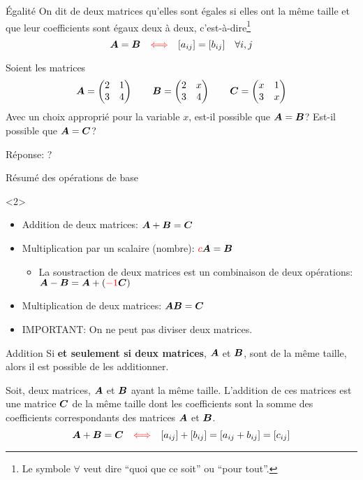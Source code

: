 \documentclass[french, handout]{beamer}
\begin{document}
\begin{frame}{Égalité}
On dit de deux matrices qu'elles sont égales si elles ont la même taille
et que leur coefficients sont égaux deux à deux, c'est-à-dire\footnote{Le symbole $\forall$ veut dire 
``quoi que ce soit'' ou ``pour tout''.}
\[
\boldsymbol{A} = \boldsymbol{B} \quad {\color{red}\Longleftrightarrow} \quad [a_{ij}] = [b_{ij}]  \quad \forall i, j
\]

\begin{example}
Soient les matrices
    \[
    \boldsymbol{A} = \begin{pmatrix}
        2 & 1 \\
        3 & 4
        \end{pmatrix}
    \qquad
    \boldsymbol{B} = \begin{pmatrix}
        2 & x \\
        3 & 4
        \end{pmatrix}
        \qquad
    \boldsymbol{C} = \begin{pmatrix}
        x & 1 \\
        3 & x
        \end{pmatrix}
    \]
Avec un choix approprié pour la variable $x$, est-il possible que $\boldsymbol{A} =\boldsymbol{B}$?
Est-il possible que $\boldsymbol{A} = \boldsymbol{C}$?
\end{example}
Réponse: ?
\end{frame}		
		
	\begin{frame}{Résumé des opérations de base}
	\begin{block}{}<2>
\begin{itemize}
	\item Addition de deux matrices: $\boldsymbol{A} + \boldsymbol{B} = \boldsymbol{C}$
	\item Multiplication par un scalaire (nombre): ${\color{red}c}\boldsymbol{A} = \boldsymbol{B}$
	\begin{itemize}
		\item La soustraction de deux matrices est un combinaison de
		deux opérations:  $\boldsymbol{A} - \boldsymbol{B} = \boldsymbol{A} + ({\color{red}-1}\boldsymbol{C})$
	\end{itemize}
	\item Multiplication de deux matrices: $\boldsymbol{A}\boldsymbol{B} = \boldsymbol{C}$
	\item IMPORTANT: On ne peut pas diviser deux matrices.
\end{itemize}
	\end{block}
\end{frame}

\begin{frame}{Addition}
Si \textbf{et seulement si deux matrices}, $\boldsymbol{A}$ et $\boldsymbol{B}$, sont de la même taille, alors il est possible
de les additionner.  
\begin{definition}
Soit, deux matrices, $\boldsymbol{A}$ et $\boldsymbol{B}$ ayant la même taille.  L'addition de
ces matrices est une matrice $\boldsymbol{C}$ de la même taille dont les coefficients sont
la somme des coefficients correspondants des matrices $\boldsymbol{A}$ et $\boldsymbol{B}$.
\[
\boldsymbol{A} + \boldsymbol{B} = \boldsymbol{C} \quad {\color{red}\Longleftrightarrow} \quad [a_{ij}] + [b_{ij}] = [a_{ij} + b_{ij}] = [c_{ij}]
\]
\end{definition}
\end{frame}
\end{document}

